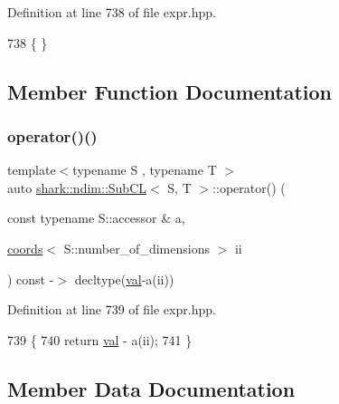 Definition at line 738 of file expr.\+hpp.


\begin{DoxyCode}
738 \{ \}
\end{DoxyCode}


\subsection{Member Function Documentation}
\hypertarget{classshark_1_1ndim_1_1_sub_c_l_a14a96380dac9f5135cedb56dee2b7776}{}\label{classshark_1_1ndim_1_1_sub_c_l_a14a96380dac9f5135cedb56dee2b7776} 
\subsubsection{\texorpdfstring{operator()()}{operator()()}}
{\footnotesize\ttfamily template$<$typename S , typename T $>$ \\
auto \hyperlink{classshark_1_1ndim_1_1_sub_c_l}{shark\+::ndim\+::\+Sub\+CL}$<$ S, T $>$\+::operator() (\begin{DoxyParamCaption}\item[{const typename S\+::accessor \&}]{a,  }\item[{\hyperlink{structshark_1_1ndim_1_1coords}{coords}$<$ S\+::number\+\_\+of\+\_\+dimensions $>$}]{ii }\end{DoxyParamCaption}) const -\/$>$ decltype(\hyperlink{classshark_1_1ndim_1_1_sub_c_l_af7420c474cd5adcbbe5672cbef936654}{val}-\/a(ii)) \hspace{0.3cm}{\ttfamily [inline]}}



Definition at line 739 of file expr.\+hpp.


\begin{DoxyCode}
739                                                                                                            
                   \{
740                 \textcolor{keywordflow}{return} \hyperlink{classshark_1_1ndim_1_1_sub_c_l_af7420c474cd5adcbbe5672cbef936654}{val} - a(ii);
741             \}
\end{DoxyCode}


\subsection{Member Data Documentation}
\hypertarget{classshark_1_1ndim_1_1_sub_c_l_af7420c474cd5adcbbe5672cbef936654}{}\label{classshark_1_1ndim_1_1_sub_c_l_af7420c474cd5adcbbe5672cbef936654} 
